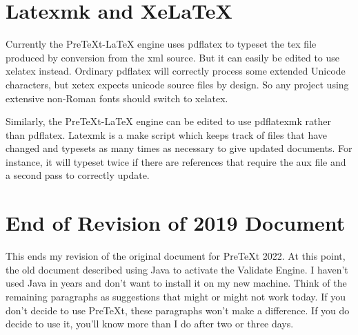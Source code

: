 \documentclass[11pt, oneside]{article}   	%
\begin{document}
\section{Latexmk and XeLaTeX} 

Currently the PreTeXt-LaTeX engine uses pdflatex to typeset the tex file produced by conversion from the xml source. But it can easily be edited to use xelatex instead. Ordinary pdflatex will correctly process some extended Unicode characters, but xetex expects unicode source files by design. So any project using extensive non-Roman fonts should switch to xelatex.

Similarly, the PreTeXt-LaTeX engine can be edited to use pdflatexmk rather than pdflatex. Latexmk is a make script which keeps track of files that have changed and typesets as many times as necessary to give updated documents. For instance, it will typeset twice if there are references that require the aux file and a second pass to correctly update. 

\section{End of Revision of 2019 Document}

This ends my revision of the original document for PreTeXt 2022. At this point, the old document described using Java to activate the Validate Engine. I haven't used Java in years and don't want to install it on my new machine. Think of the remaining paragraphs as suggestions that might or might not work today. If you don't decide to use PreTeXt, these paragraphs won't make a difference. If you do decide to use it, you'll know more than I do after two or three days. 

\newpage
\end{document}
